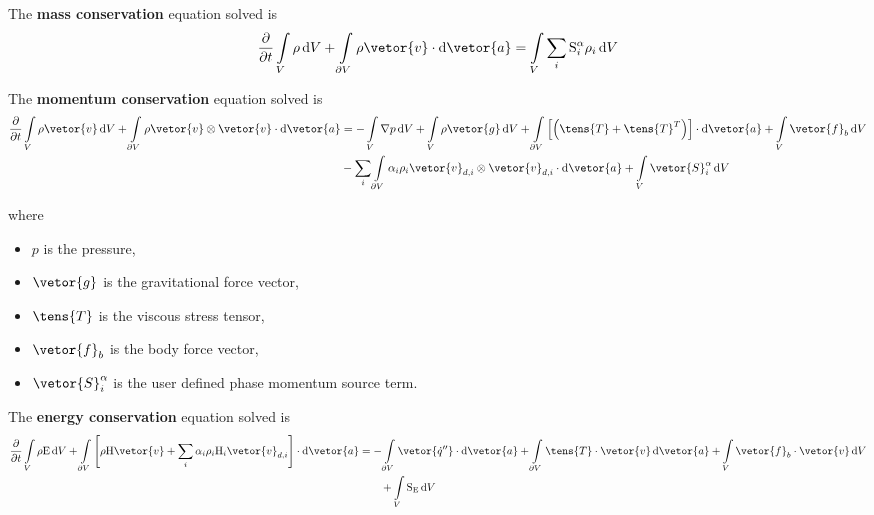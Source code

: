 The \textbf{mass conservation} equation solved is
\begin{equation}\label{eq_vof_mass}
\frac{\partial}{\partial t}\int\limits_{V} \rho\,\mathrm{d}V +
\int\limits_{\partial V} \rho \vetor{v} \cdot \mathrm{d}\vetor{a}
= \int\limits_{V} \sum_{i}\mathrm{S}^{\alpha}_{i} \rho_{i}\,\mathrm{d}V
\end{equation}


The \textbf{momentum conservation} equation solved is
\begin{equation}\label{eq_vof_mom}
\begin{split}
\frac{\partial}{\partial t}\int\limits_{V} \rho \vetor{v}\,\mathrm{d}V +
\int\limits_{\partial V} \rho\vetor{v} \otimes \vetor{v} \cdot \mathrm{d}\vetor{a}
&= -\int\limits_{V} \nabla p\,\mathrm{d}V + \int\limits_{V} \rho \vetor{g}\,\mathrm{d}V
+ \int\limits_{\partial V}\left[\left(\tens{T} + \tens{T}^{T}\right)\right]\cdot \mathrm{d}\vetor{a} 
 + \int\limits_{V} \vetor{f}_{b}\,\mathrm{d}V\\
& - \sum_{i}\int\limits_{\partial V} \alpha_{i} \rho_{i} \vetor{v}_{d,i} \otimes \vetor{v}_{d,i} \cdot \mathrm{d}\vetor{a}
 + \int\limits_{V}\vetor{S}^{\alpha}_{i}\,\mathrm{d}V
\end{split}
\end{equation}

\noindent where
\begin{itemize}[topsep=0pt, labelindent=40pt,labelsep=5pt, parsep = 2pt, listparindent=2em]
\item $p$ is the pressure,
\item $\vetor{g}$ is the gravitational force vector,
\item $\tens{T}$ is the viscous stress tensor,
\item $\vetor{f}_{b}$ is the body force vector,
\item $\vetor{S}^{\alpha}_{i}$ is the user defined phase momentum source term.
\end{itemize}


The \textbf{energy conservation} equation solved is
\begin{equation}\label{eq_vof_energy}
\begin{split}
\frac{\partial}{\partial t}\int\limits_{V}\rho \mathrm{E}\,\mathrm{d}V +
\int\limits_{\partial V} \left[\rho \mathrm{H} \vetor{v} + \sum_{i}\alpha_{i} \rho_{i} \mathrm{H}_{i} \vetor{v}_{d,i}\right] \cdot \mathrm{d}\vetor{a}
&= - \int\limits_{\partial V} \vetor{\dot{q}''}  \cdot \mathrm{d}\vetor{a} + \int\limits_{\partial V} \tens{T}\cdot\vetor{v}\,\mathrm{d}\vetor{a}
 + \int\limits_{V}\vetor{f}_{b}\cdot\vetor{v}\,\mathrm{d}V\\
&\qquad{} + \int\limits_{V} \mathrm{S}_{\mathrm{E}}\,\mathrm{d}V
\end{split}
\end{equation}

